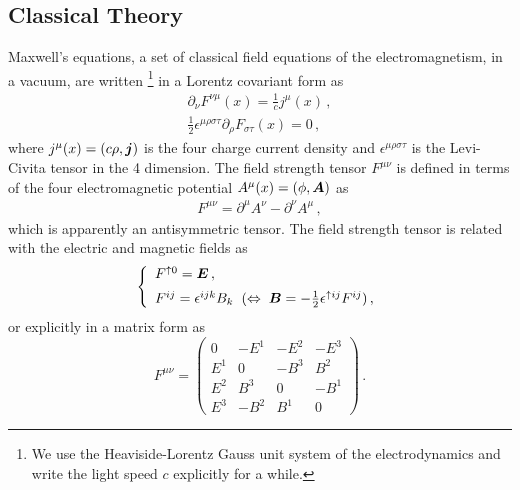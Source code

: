 \noindent
\subsection{Classical Theory}
Maxwell's equations,
a set of classical field equations of the electromagnetism,
in a vacuum, 
are written 
\footnote{%
We use the Heaviside-Lorentz Gauss unit system of the electrodynamics and
write the light speed $c$ explicitly for a while.
}%
in a Lorentz covariant form as
\begin{eqnarray}
\partial_\nu F^{\nu \mu}(x) = \frac{1}{c} j^{\mu}(x)\,,
\label{eqn:inhomMxwF}
\\
\frac{1}{2}\epsilon^{\mu \rho \sigma \tau}
\partial_\rho F_{\sigma \tau}(x) = 0
\,,
\label{eqn:homMxwF}
\end{eqnarray}
where
$j^\mu(x) = (c \rho, \mbox{\boldmath $j$})$ is the four charge current density
and
$\epsilon^{\mu \rho \sigma \tau}$ is the Levi-Civita tensor in the 4 dimension.
The field strength tensor $F^{\mu \nu}$ is defined in terms of
the four electromagnetic potential
$A^\mu(x) = (\phi, \mbox{\boldmath $A$})$ as
\begin{eqnarray}
F^{\mu \nu} = \partial^{\mu} A^{\nu} - \partial^{\nu} A^{\mu}\,,
\label{eqn:FdefinedbyA}
\end{eqnarray}
which is apparently an antisymmetric tensor.
The field strength tensor is related with
the electric and magnetic fields
as
\begin{eqnarray}
\left\{
\begin{array}{l}
F^{\uparrow 0} = \bld{E}\,,
\vspace{2mm}
\\
F^{ij} =  \epsilon^{ijk} B_k
\hspace{2mm}
( \Leftrightarrow 
\hspace{1mm}\bld{B} = -\frac{1}{2}\epsilon^{\uparrow ij}F^{ij}  )
\,,
\end{array}
\right.
\label{eqn:FbyEB}
\end{eqnarray}
or explicitly in a matrix form as
\begin{equation}
F^{\mu\nu}
=
\left(
\begin{array}{cccc}
0 & -E^1& -E^2& -E^3 \\
E^1 &0&-B^3& B^2\\
E^2  &B^3&0&-B^1 \\
E^3 &-B^2&B^1& 0
\end{array}
\right)\,.
\label{eqn:FcontentbyEandB} 
\end{equation}
